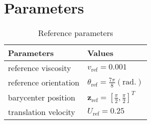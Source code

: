 
\appendix
\section{Parameters}
\label{appendix:simulation-parameters}
\begin{table}[htbp]
    \centering
    \caption{Reference parameters}
    \begin{tabular}{|l|l|}
        \hline
        Parameters            & Values                                                       \\
        \hline
        reference viscosity   & $v_{\text{ref}} = 0.001$                                     \\
        reference orientation & $\theta_{\text{ref}}  = \frac{7 \pi}{8} (\text{rad.})$       \\
        barycenter position   & $\bm{z}_{\text{ref}} = \left[\frac\pi2, \frac\pi2 \right]^T$ \\
        translation velocity  & $U_{\text{ref}} = 0.25$                                      \\
        \hline
    \end{tabular}
    \label{tab:ref}
\end{table}


